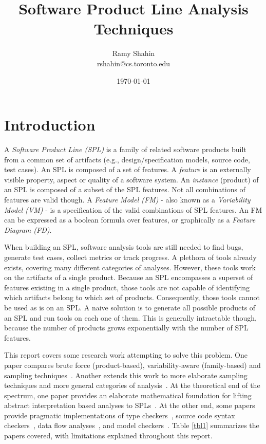 \documentclass[11pt]{article}
\title{Software Product Line Analysis Techniques}
\author{Ramy Shahin \\ rshahin@cs.toronto.edu}
\date{\today}                                           %
\newcommand{\term}[1] {\emph{#1}}
\begin{document}
\maketitle


\section{Introduction}
A \term{Software Product Line (SPL)} is a family of related software products built from a common set of artifacts (e.g., design/specification models, source code, test cases). An SPL is composed of a set of features. A \term{feature} is an externally visible property, aspect or quality of a software system. An \term{instance} (product) of an SPL is composed of a subset of the SPL features. Not all combinations of features are valid though. A \term{Feature Model (FM)} - also known as a \term{Variability Model (VM)} - is a specification of the valid combinations of SPL features. An FM can be expressed as a boolean formula over features, or graphically as a \term{Feature Diagram (FD)}.

When building an SPL, software analysis tools are still needed to find bugs, generate test cases, collect metrics or track progress. A plethora of tools already exists, covering many different categories of analyses. However, these tools work on the artifacts of a single product. Because an SPL encompasses a superset of features existing in a single product, those tools are not capable of identifying which artifacts belong to which set of products. Consequently, those tools cannot be used as is on an SPL. A naive solution is to generate all possible products of an SPL and run tools on each one of them. This is generally intractable though, because the number of products grows exponentially with the number of SPL features.

This report covers some research work attempting to solve this problem. One paper compares brute force (product-based), variability-aware (family-based) and sampling techniques~\cite{Apel:2013}. Another extends this work to more elaborate sampling techniques and more general categories of analysis~\cite{Liebig:2013}. At the theoretical end of the spectrum, one paper provides an elaborate mathematical foundation for lifting abstract interpretation based analyses to SPLs~\cite{Midtgaard:2015}. At the other end, some papers provide pragmatic implementations of type checkers~\cite{Kastner:2012}, source code syntax checkers~\cite{Gazzillo:2012}, data flow analyses~\cite{Bodden:2013}, and model checkers~\cite{Classen:2013}. Table \ref{tbl1} summarizes the papers covered, with limitations explained throughout this report.
\end{document}
